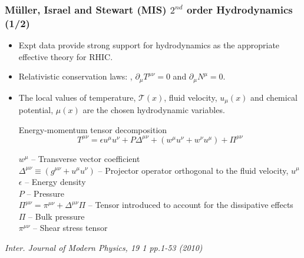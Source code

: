 \documentclass[aspectratio=1610]{beamer}
\begin{document}

\begin{frame}
\frametitle{Müller, Israel and Stewart (MIS) $2^{nd}$ order Hydrodynamics (1/2)}

\begin{itemize}

\item Expt data provide strong support for hydrodynamics as the appropriate effective theory for RHIC.


\item Relativistic conservation laws: , $\partial_{\mu} T^{\mu\nu}=0$ and $\partial_{\mu} N^\mu=0$. 


\item The local values of temperature, $\mathcal{T}(x)$, fluid velocity, $u_\mu(x)$ and chemical potential, $\mu(x)$ are the chosen hydrodynamic variables. 

\begin{block}{Energy-momentum tensor decomposition}
\begin{equation}
T^{\mu\nu}=\epsilon u^\mu u^\nu + P\Delta^{\mu\nu}+ ( w^\mu u^\nu + w^\nu u^\mu) + \Pi^{\mu\nu}
\end{equation}

\end{block}

\hspace*{10mm}		$w^\mu$ -- Transverse vector coefficient\\
\hspace*{10mm}		$\Delta^{\mu\nu} \equiv ( g^{\mu\nu} +  u^\mu u^\nu)$ -- Projector operator orthogonal to the fluid velocity, $u^\mu$\\
\hspace*{10mm}		$\epsilon$ --  Energy density  \\
\hspace*{10mm}		$P$ --  Pressure\\
\hspace*{10mm}		$\Pi^{\mu\nu} = \pi^{\mu\nu} +  \Delta^{\mu\nu}\Pi$  --  Tensor introduced to account for the dissipative effects\\
\hspace*{10mm}		$\Pi$ -- Bulk pressure\\
\hspace*{10mm}		$\pi^{\mu\nu}$ -- Shear stress tensor

\end{itemize}
\textit{Inter. Journal of Modern Physics, 19 1 pp.1-53 (2010)} \\
\end{frame}
\end{document}
